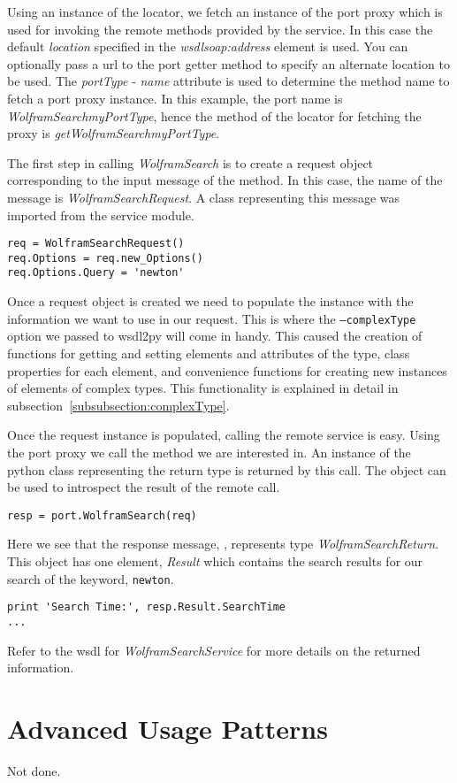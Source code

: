 Using an instance of the locator, we fetch an instance of the port proxy
which is used for invoking the remote methods provided by the service.  In
this case the default {\it location} specified in the {\it wsdlsoap:address}
element is used.  You can optionally pass a url to the port getter method to
specify an alternate location to be used.  The {\it portType} - {\it name} 
attribute is used to determine the method name to fetch a port proxy instance.
In this example, the port name is {\it WolframSearchmyPortType}, hence the 
method of the locator for fetching the proxy is {\it getWolframSearchmyPortType}.

The first step in calling {\it WolframSearch} is to create a request object
corresponding to the input message of the method.  In this case, the name of
the message is {\it WolframSearchRequest}.  A class representing this message
was imported from the service module.

\begin{verbatim}
req = WolframSearchRequest()
req.Options = req.new_Options()
req.Options.Query = 'newton'
\end{verbatim}

Once a request object is created we need to populate the instance with the
information we want to use in our request.  This is where the {\tt --complexType}
option we passed to wsdl2py will come in handy.  This caused the creation of 
functions for getting and setting elements and attributes of the type, class 
properties for each element, and convenience functions for creating new instances
of elements of complex types.  This functionality is explained in detail in 
subsection~\ref{subsubsection:complexType}.

Once the request instance is populated, calling the remote service is easy.  Using
the port proxy we call the method we are interested in.  An instance of the python
class representing the return type is returned by this call.  The  object
can be used to introspect the result of the remote call.

\begin{verbatim}
resp = port.WolframSearch(req)
\end{verbatim}

Here we see that the response message, , represents type {\it WolframSearchReturn}.
This object has one element, {\it Result} which contains the search results for our
search of the keyword, {\tt newton}.

\begin{verbatim}
print 'Search Time:', resp.Result.SearchTime
...
\end{verbatim}

Refer to the wsdl for {\it WolframSearchService} for more details on the returned information.


\section{Advanced Usage Patterns}
Not done.


